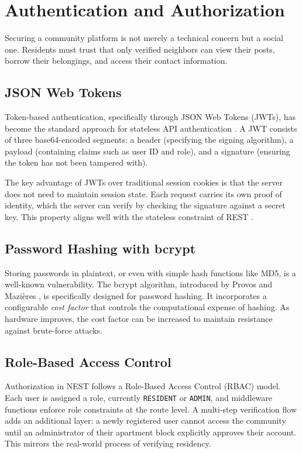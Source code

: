 \section{Authentication and Authorization}

Securing a community platform is not merely a technical concern but a social one. Residents must trust that only verified neighbors can view their posts, borrow their belongings, and access their contact information.

\subsection{JSON Web Tokens}

Token-based authentication, specifically through JSON Web Tokens (JWTs), has become the standard approach for stateless API authentication \cite{jones2015jwt}. A JWT consists of three base64-encoded segments: a header (specifying the signing algorithm), a payload (containing claims such as user ID and role), and a signature (ensuring the token has not been tampered with).

The key advantage of JWTs over traditional session cookies is that the server does not need to maintain session state. Each request carries its own proof of identity, which the server can verify by checking the signature against a secret key. This property aligns well with the stateless constraint of REST \cite{fielding2000rest}.

\subsection{Password Hashing with bcrypt}

Storing passwords in plaintext, or even with simple hash functions like MD5, is a well-known vulnerability. The bcrypt algorithm, introduced by Provos and Mazi\`{e}res \cite{provos1999bcrypt}, is specifically designed for password hashing. It incorporates a configurable \textit{cost factor} that controls the computational expense of hashing. As hardware improves, the cost factor can be increased to maintain resistance against brute-force attacks.

\subsection{Role-Based Access Control}

Authorization in NEST follows a Role-Based Access Control (RBAC) model. Each user is assigned a role, currently \texttt{RESIDENT} or \texttt{ADMIN}, and middleware functions enforce role constraints at the route level. A multi-step verification flow adds an additional layer: a newly registered user cannot access the community until an administrator of their apartment block explicitly approves their account. This mirrors the real-world process of verifying residency.

